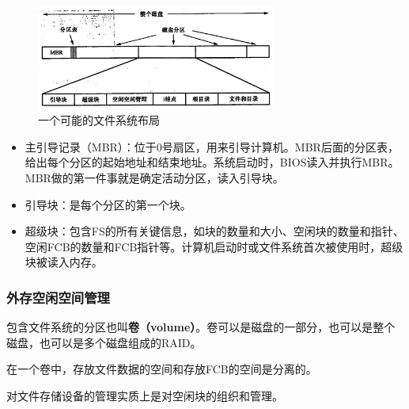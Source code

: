 \documentclass[12pt, a4paper, oneside]{ctexart}
\begin{document}
\begin{figure}
  \centering
  \includegraphics[width=0.7\textwidth]{./images/fs-layout.png}
  \caption{一个可能的文件系统布局}
  \label{fs-layout}
\end{figure}

\begin{itemize}
  \item 主引导记录（MBR）：位于0号扇区，用来引导计算机。MBR后面的分区表，给出每个分区的起始地址和结束地址。系统启动时，BIOS读入并执行MBR。MBR做的第一件事就是确定活动分区，读入引导块。
  \item 引导块：是每个分区的第一个块。
  \item 超级块：包含FS的所有关键信息，如块的数量和大小、空闲块的数量和指针、空闲FCB的数量和FCB指针等。计算机启动时或文件系统首次被使用时，超级块被读入内存。
\end{itemize}

\subsubsection{外存空闲空间管理}

包含文件系统的分区也叫\textbf{卷（volume）}。卷可以是磁盘的一部分，也可以是整个磁盘，也可以是多个磁盘组成的RAID。

在一个卷中，存放文件数据的空间和存放FCB的空间是分离的。

对文件存储设备的管理实质上是对空闲块的组织和管理。
\end{document}
